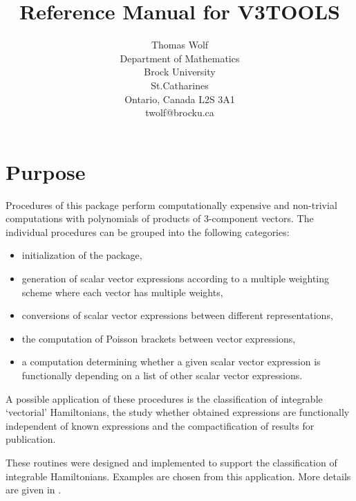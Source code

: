 \documentclass[12pt]{article}
\title{Reference Manual for V3TOOLS}
\author{Thomas Wolf \\
        Department of Mathematics \\
        Brock University \\
        St.Catharines \\
        Ontario, Canada L2S 3A1 \\
        twolf@brocku.ca}
\begin{document}
\maketitle

\section{Purpose}
Procedures of this package perform computationally expensive and
non-trivial computations with polynomials of products of 3-component vectors.
The individual procedures can be grouped into the following categories:
\begin{itemize}
\item initialization of the package,
\item generation of scalar vector expressions according to a multiple
      weighting scheme where each vector has multiple weights,
\item conversions of scalar vector expressions between different
      representations,
\item the computation of Poisson brackets between vector expressions,
\item a computation determining whether a given scalar vector expression
      is functionally depending on a list of other scalar vector expressions.
\end{itemize}
A possible application of these procedures is the classification of
integrable `vectorial' Hamiltonians, the study whether obtained
expressions are functionally independent of known expressions and
the compactification of results for publication.

These routines were designed and implemented to support the classification
of integrable Hamiltonians. Examples are chosen from this application.
More details are given in \cite{SoWo04}.
\end{document}
